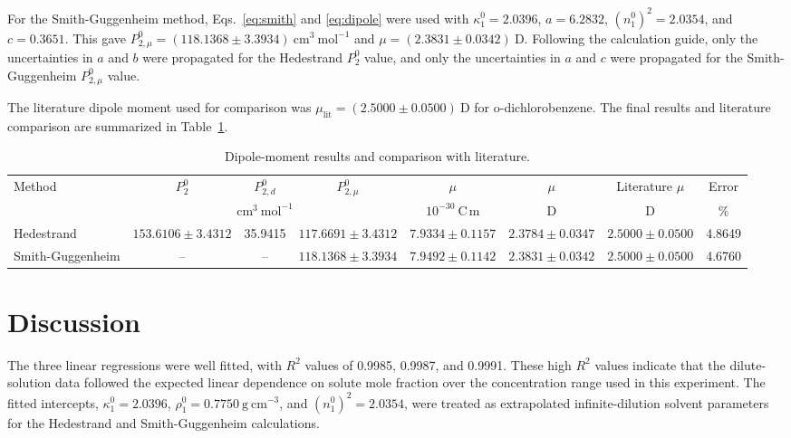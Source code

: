 \documentclass[11pt]{article}
\begin{document}
For the Smith-Guggenheim method, Eqs.~\ref{eq:smith} and \ref{eq:dipole} were used with $\kappa_1^0=2.0396$, $a=6.2832$, $(n_1^0)^2=2.0354$, and $c=0.3651$. This gave $P_{2,\mu}^0=(118.1368\pm3.3934)\ \mathrm{cm^3\ mol^{-1}}$ and $\mu=(2.3831\pm0.0342)\ \mathrm{D}$. Following the calculation guide, only the uncertainties in $a$ and $b$ were propagated for the Hedestrand $P_2^0$ value, and only the uncertainties in $a$ and $c$ were propagated for the Smith-Guggenheim $P_{2,\mu}^0$ value.\cite{lab_manual}

The literature dipole moment used for comparison was $\mu_{\mathrm{lit}}=(2.5000\pm0.0500)\ \mathrm{D}$ for o-dichlorobenzene.\cite{lide1995crc} The final results and literature comparison are summarized in Table~\ref{tab:final}.

\begin{table}[H]
\centering
\caption{Dipole-moment results and comparison with literature.}
\label{tab:final}
\small
\begin{adjustbox}{max width=\textwidth}
\begin{tabular}{lccccccc}
\toprule
Method & $P_2^0$ & $P_{2,d}^0$ & $P_{2,\mu}^0$ & $\mu$ & $\mu$ & Literature $\mu$ & Error \\
 & \multicolumn{3}{c}{$\mathrm{cm^3\ mol^{-1}}$} & $10^{-30}\ \mathrm{C\,m}$ & D & D & \% \\
\midrule
Hedestrand & $153.6106\pm3.4312$ & 35.9415 & $117.6691\pm3.4312$ & $7.9334\pm0.1157$ & $2.3784\pm0.0347$ & $2.5000\pm0.0500$ & 4.8649 \\
Smith-Guggenheim & -- & -- & $118.1368\pm3.3934$ & $7.9492\pm0.1142$ & $2.3831\pm0.0342$ & $2.5000\pm0.0500$ & 4.6760 \\
\bottomrule
\end{tabular}
\end{adjustbox}
\end{table}


\section*{Discussion}

The three linear regressions were well fitted, with $R^2$ values of 0.9985, 0.9987, and 0.9991. These high $R^2$ values indicate that the dilute-solution data followed the expected linear dependence on solute mole fraction over the concentration range used in this experiment. The fitted intercepts, $\kappa_1^0=2.0396$, $\rho_1^0=0.7750\ \mathrm{g\ cm^{-3}}$, and $(n_1^0)^2=2.0354$, were treated as extrapolated infinite-dilution solvent parameters for the Hedestrand and Smith-Guggenheim calculations. 
\end{document}
